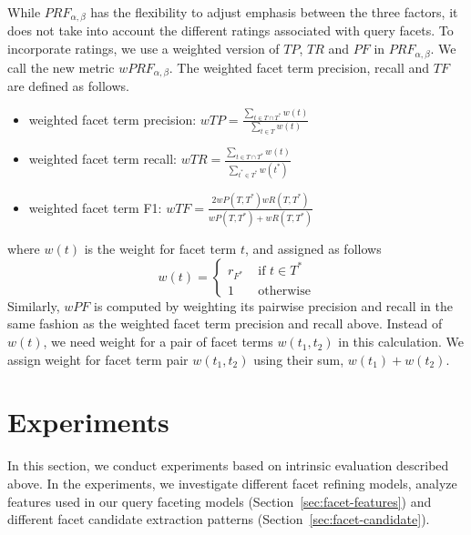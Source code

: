 While $PRF_{\alpha,\beta}$ has the flexibility to adjust emphasis between the three factors, it does not take into account the different ratings associated with query facets. To incorporate ratings, we use a weighted version of $T\!P$, $T\!R$ and $P\!F$ in $PRF_{\alpha,\beta}$. We call the new metric $wPRF_{\alpha,\beta}$. The weighted facet term precision, recall and $T\!F$ are defined as follows.
\begin{itemize}
 \item weighted facet term precision: $wT\!P=\frac{\sum_{t \in T \cap T^*}{w(t)}}{\sum_{t \in T}{w(t)}}$
 \item weighted facet term recall: $wT\!R=\frac{\sum_{t \in T \cap T^*}{w(t)}}{\sum_{t^* \in T^*}{w(t^*)}}$ 
  \item weighted facet term F1: $wT\!F=\frac{2wP(T,T^*)wR(T,T^*)}{wP(T,T^*)+wR(T,T^*)}$ 
\end{itemize}
where $w(t)$ is the weight for facet term $t$, and assigned as follows
$$
w(t) = \left\{ \begin{array}{rl}
r_{F^*} &\mbox{ if $t \in T^*$} \\
1 &\mbox{ otherwise}
\end{array} \right.
$$
Similarly, $wP\!F$ is computed by weighting its pairwise precision and recall in the same fashion as the weighted facet term precision and recall above.
Instead of $w(t)$, we need weight for a pair of facet terms $w(t_1,t_2)$ in this calculation.
We assign weight for facet term pair $w(t_1, t_2)$ using their sum, $w(t_1) + w(t_2)$.


\section{Experiments}
\label{sec:ie-exp}
In this section, we conduct experiments based on intrinsic evaluation described above. In the experiments, we investigate different facet refining models, analyze features used in our query faceting models (Section~\ref{sec:facet-features}) and different facet candidate extraction patterns (Section~\ref{sec:facet-candidate}).
